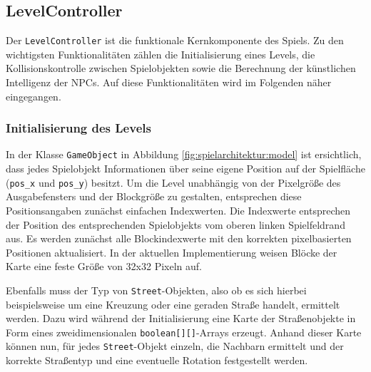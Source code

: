 \subsection{LevelController}
\label{sub:architektur:levelcontroller}

Der \texttt{LevelController} ist die funktionale Kernkomponente des Spiels.
Zu den wichtigsten Funktionalitäten zählen die Initialisierung eines Levels, die Kollisionskontrolle zwischen Spielobjekten sowie die Berechnung der künstlichen Intelligenz der NPCs.
Auf diese Funktionalitäten wird im Folgenden näher eingegangen.

\subsubsection{Initialisierung des Levels}
In der Klasse \texttt{GameObject} in Abbildung \ref{fig:spielarchitektur:model} ist ersichtlich, dass jedes Spielobjekt Informationen über seine eigene Position auf der Spielfläche (\texttt{pos\_x} und \texttt{pos\_y}) besitzt.
Um die Level unabhängig von der Pixelgröße des Ausgabefensters und der Blockgröße zu gestalten, entsprechen diese Positionsangaben zunächst einfachen Indexwerten.
Die Indexwerte entsprechen der Position des entsprechenden Spielobjekts vom oberen linken Spielfeldrand aus.
Es werden zunächst alle Blockindexwerte mit den korrekten pixelbasierten Positionen aktualisiert.
In der aktuellen Implementierung weisen Blöcke der Karte eine feste Größe von 32x32 Pixeln auf.

Ebenfalls muss der Typ von \texttt{Street}-Objekten, also ob es sich hierbei beispielsweise um eine Kreuzung oder eine geraden Straße handelt, ermittelt werden.
Dazu wird während der Initialisierung eine Karte der Straßenobjekte in Form eines zweidimensionalen \texttt{boolean[][]}-Arrays erzeugt.
Anhand dieser Karte können nun, für jedes \texttt{Street}-Objekt einzeln, die Nachbarn ermittelt und der korrekte Straßentyp und eine eventuelle Rotation festgestellt werden.

